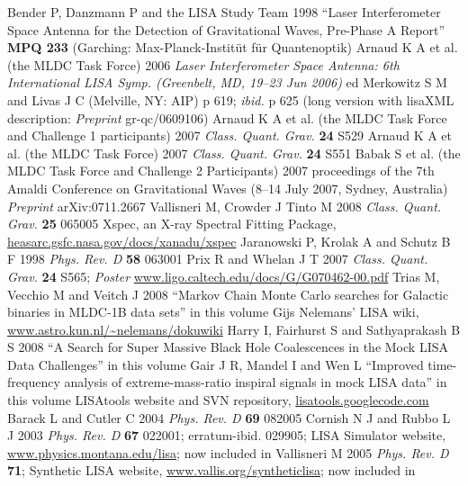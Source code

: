 \documentclass{iopart}
\begin{document}
\begin{thebibliography}{99}
%
 Bender P, Danzmann P and the LISA Study Team 1998 ``Laser Interferometer Space Antenna for the Detection of Gravitational Waves, Pre-Phase A Report'' \textbf{MPQ 233} (Garching: Max-Planck-Instit\"ut f\"ur Quantenoptik) 
%
 Arnaud K A et al. (the MLDC Task Force) 2006 \textit{Laser Interferometer Space Antenna: 6th International LISA Symp. (Greenbelt, MD, 19--23 Jun 2006)} ed Merkowitz S M and Livas J C (Melville, NY: AIP) p 619; \textit{ibid.} p 625 (long version with lisaXML description: \textit{Preprint} gr-qc/0609106)
%
 Arnaud K A et al. (the MLDC Task Force and Challenge 1 participants) 2007 \textit{Class. Quant. Grav.} \textbf{24} S529
%
 Arnaud K A et al. (the MLDC Task Force) 2007 \textit{Class. Quant. Grav.} \textbf{24} S551
%
 Babak S et al. (the MLDC Task Force and Challenge 2 Participants) 2007 proceedings of the 7th Amaldi Conference on Gravitational Waves (8--14 July 2007, Sydney, Australia) \textit{Preprint} arXiv:0711.2667
%
 Vallisneri M, Crowder J Tinto M 2008 \textit{Class. Quant. Grav.} \textbf{25} 065005
%
 Xspec, an X-ray Spectral Fitting Package, \url{heasarc.gsfc.nasa.gov/docs/xanadu/xspec}
%
 Jaranowski P, Krolak A and Schutz B F 1998 \textit{Phys. Rev. D} \textbf{58} 063001
%
 Prix R and Whelan J T 2007 \textit{Class. Quant. Grav.} \textbf{24} S565; \textit{Poster} \url{www.ligo.caltech.edu/docs/G/G070462-00.pdf}
%
 Trias M, Vecchio M and Veitch J 2008
``Markov Chain Monte Carlo searches for Galactic binaries in MLDC-1B data sets'' in this volume
%
 Gijs Nelemans' LISA wiki, \url{www.astro.kun.nl/~nelemans/dokuwiki}
%
 Harry I, Fairhurst S and Sathyaprakash B S 2008 ``A Search for Super Massive Black Hole Coalescences in the Mock LISA Data Challenges'' in this volume
%
 Gair J R, Mandel I and Wen L
``Improved time-frequency analysis of extreme-mass-ratio inspiral signals in mock LISA data'' in this volume
%
 LISAtools website and SVN repository, \url{lisatools.googlecode.com}
%
 Barack L and Cutler C 2004 \textit{Phys. Rev. D} \textbf{69} 082005
%
 Cornish N J and Rubbo L J 2003 \emph{Phys. Rev. D} \textbf{67} 022001; erratum-ibid. 029905; LISA Simulator website, \url{www.physics.montana.edu/lisa}; now included in \cite{lisatools}
%
 Vallisneri M 2005 \emph{Phys. Rev. D} \textbf{71}; Synthetic LISA website, \url{www.vallis.org/syntheticlisa}; now included in \cite{lisatools}

\end{thebibliography}
\end{document}
